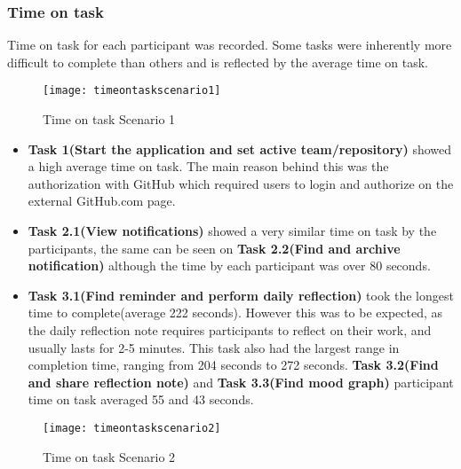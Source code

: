 \subsubsection{Time on task}
Time on task for each participant was recorded. Some tasks were inherently more difficult to complete than others and is reflected by the average time on task.
\begin{figure}[h!]
    \centering
        \texttt{[image: timeontaskscenario1]}
    \caption{Time on task Scenario 1}
    \label{timeontaskscenario1}
\end{figure}
\begin{itemize}
	\item \textbf{Task 1(Start the application and set active team/repository)} showed a high average time on task. The main reason behind this was the authorization with GitHub which required users to login and authorize on the external GitHub.com page.
	\item \textbf{Task 2.1(View notifications)} showed a very similar time on task by the participants, the same can be seen on \textbf{Task 2.2(Find and archive notification)} although the time by each participant was over 80 seconds.
	\item \textbf{Task 3.1(Find reminder and perform daily reflection)} took the longest time to complete(average 222 seconds). However this was to be expected, as the daily reflection note requires participants to reflect on their work, and usually lasts for 2-5 minutes. This task also had the largest range in completion time, ranging from 204 seconds to 272 seconds. \textbf{Task 3.2(Find and share reflection note)} and \textbf{Task 3.3(Find mood graph)} participant time on task averaged 55 and 43 seconds. 
\end{itemize}
\begin{figure}[h!]
    \centering
        \texttt{[image: timeontaskscenario2]}
    \caption{Time on task Scenario 2}
    \label{timeontaskscenario2}
\end{figure}
